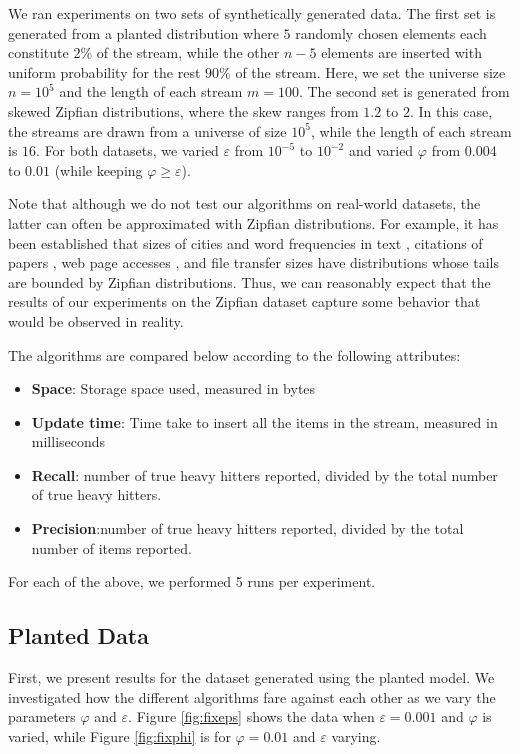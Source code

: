 \documentclass[sigconf,review=true,anonymous=true,screen]{acmart}
\newcommand{\eps}{\varepsilon}
\renewcommand{\phi}{\varphi}
\begin{document}
We ran experiments on two sets of synthetically generated data. The first set is generated from a planted distribution where $5$ randomly
chosen elements each constitute $2\%$ of the stream, while the other $n-5$ elements are inserted with uniform probability for the rest $90\%$ of the stream. Here, we
set the universe size $n = 10^5$ and the length of each stream $m=100$. The second set is generated from skewed {Zipfian} distributions, where the skew ranges from $1.2$ to $2$. 
In this case, the streams are drawn from a universe of size $10^5$, while the length of each stream is $16$.  
For both datasets, we varied $\eps$ from $10^{-5}$ to $10^{-2}$ and varied $\phi$ from $0.004$ to $0.01$ (while keeping $\phi \geq \eps$).

Note that although we do not test our algorithms on real-world datasets, the latter can often be approximated with Zipfian distributions. For example, it has been established that sizes of cities and word frequencies in text \cite{zipf}, citations of papers \cite{red98}, web page accesses \cite{bre99}, and file transfer sizes \cite{bes99} have distributions whose tails are bounded by Zipfian distributions. Thus, we can reasonably expect that the results of our experiments on the Zipfian dataset capture some behavior that would be observed in reality.

The algorithms are compared below according to the following attributes:
\begin{itemize}
\item
\textbf{Space}: Storage space used, measured in bytes
\item
\textbf{Update time}: Time take to insert all the items in the stream, measured in milliseconds
\item
\textbf{Recall}: number of true heavy hitters reported, divided by the total number of true heavy hitters.
\item
\textbf{Precision}:number of true heavy hitters reported, divided by the total number of items reported.
\end{itemize}
For each of the above, we performed 5 runs per experiment.

\subsection{Planted Data}




First, we present results for the dataset generated using the planted model. We investigated how the different algorithms fare
against each other as we vary the parameters $\phi$ and $\eps$. Figure \ref{fig:fixeps} shows the data when $\eps=0.001$ and $\phi$
is varied, while Figure \ref{fig:fixphi} is for $\phi=0.01$ and $\eps$ varying.
\end{document}
